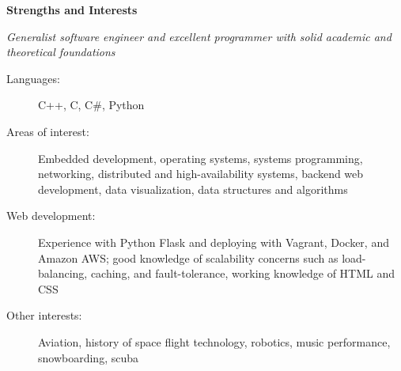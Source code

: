 \documentclass[letterpaper,11pt]{article}
\newcommand{\resheading}[1]{{\large \colorbox{mygrey}{\begin{minipage}{\textwidth}{\textbf{#1 \vphantom{p\^{E}}}}\end{minipage}}}}
\begin{document}
\resheading{Strengths and Interests} 
	\linebreak	
	\textit{Generalist software engineer and excellent programmer with solid academic and theoretical foundations}
	\begin{description}
		\item[Languages:] { \footnotesize C++, C, C\#, Python}
		\item[Areas of interest:] { \footnotesize Embedded development, operating systems, systems programming, networking, distributed and high-availability systems, backend web development, data visualization, data structures and algorithms}
		\item[Web development:]  { \footnotesize Experience with Python Flask and deploying with Vagrant, Docker, and Amazon AWS; good knowledge of scalability concerns such as load-balancing, caching, and fault-tolerance, working knowledge of HTML and CSS }
		\item[Other interests:] { \footnotesize Aviation, history of space flight technology, robotics, music performance, snowboarding, scuba }
	\end{description} %
	
\end{document}

